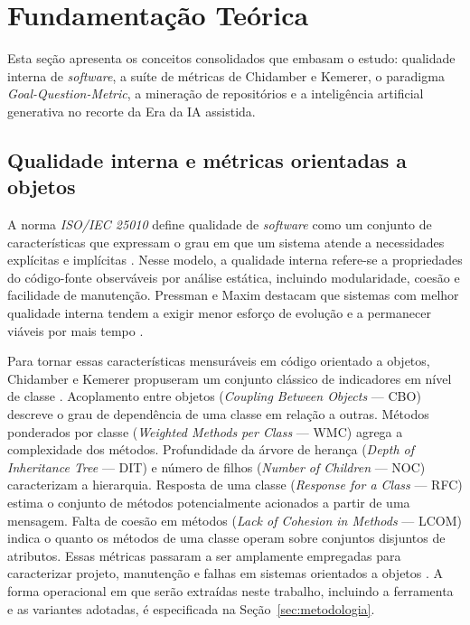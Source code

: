 \section{Fundamentação Teórica}
\label{sec:fund}

Esta seção apresenta os conceitos consolidados que embasam o estudo: qualidade interna de \emph{software}, a suíte de métricas de Chidamber e Kemerer, o paradigma \emph{Goal-Question-Metric}, a mineração de repositórios e a inteligência artificial generativa no recorte da Era da IA assistida.

\subsection{Qualidade interna e métricas orientadas a objetos}
\label{subsec:fund-qualidade}

A norma \emph{ISO/IEC 25010} define qualidade de \emph{software} como um conjunto de características que expressam o grau em que um sistema atende a necessidades explícitas e implícitas \cite{iso25010}. Nesse modelo, a qualidade interna refere-se a propriedades do código-fonte observáveis por análise estática, incluindo modularidade, coesão e facilidade de manutenção. Pressman e Maxim destacam que sistemas com melhor qualidade interna tendem a exigir menor esforço de evolução e a permanecer viáveis por mais tempo \cite{pressman:21}.

Para tornar essas características mensuráveis em código orientado a objetos, Chidamber e Kemerer propuseram um conjunto clássico de indicadores em nível de classe \cite{chidamber:94}. Acoplamento entre objetos (\emph{Coupling Between Objects} --- CBO) descreve o grau de dependência de uma classe em relação a outras. Métodos ponderados por classe (\emph{Weighted Methods per Class} --- WMC) agrega a complexidade dos métodos. Profundidade da árvore de herança (\emph{Depth of Inheritance Tree} --- DIT) e número de filhos (\emph{Number of Children} --- NOC) caracterizam a hierarquia. Resposta de uma classe (\emph{Response for a Class} --- RFC) estima o conjunto de métodos potencialmente acionados a partir de uma mensagem. Falta de coesão em métodos (\emph{Lack of Cohesion in Methods} --- LCOM) indica o quanto os métodos de uma classe operam sobre conjuntos disjuntos de atributos. Essas métricas passaram a ser amplamente empregadas para caracterizar projeto, manutenção e falhas em sistemas orientados a objetos \cite{singh:12,radjenovic:13,aniche:16}. A forma operacional em que serão extraídas neste trabalho, incluindo a ferramenta e as variantes adotadas, é especificada na Seção~\ref{sec:metodologia}.

